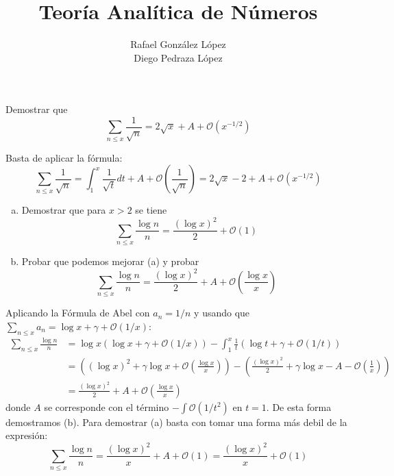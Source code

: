 \documentclass[twoside]{article}
\begin{document}
\title{Teoría Analítica de Números}
\author{Rafael González López\\Diego Pedraza López}
\maketitle

\begin{ejercicio}{1}
Demostrar que
\[ \sum_{n≤x} \frac{1}{\sqrt{n}} =  2 \sqrt{x} + A + \mathcal{O}(x^{-1/2}) \]
\end{ejercicio}
\begin{solucion}
Basta de aplicar la fórmula:
\[ \sum_{n≤x} \frac{1}{\sqrt{n}} = \int_1^x \frac{1}{\sqrt{t}}dt + A + \mathcal{O}\left(\frac{1}{\sqrt{n}}\right) = 2 \sqrt{x}-2+A + \mathcal{O}(x^{-1/2}) \]
\end{solucion}

\newpage

\begin{ejercicio}{2}\mbox{}
\begin{enumerate}[(a)]
	\item Demostrar que para $x > 2$ se tiene
	\[ \sum_{n≤x} \frac{\log n}{n} = \frac{(\log x)^2}{2} + \mathcal{O}(1) \]
	\item Probar que podemos mejorar (a) y probar
	\[ \sum_{n≤x} \frac{\log n}{n} = \frac{(\log x)^2}{2} + A + \mathcal{O}\left(\frac{\log x}{x}\right) \]
\end{enumerate}
\end{ejercicio}
\begin{solucion}
Aplicando la Fórmula de Abel con $a_n=1/n$ y usando que $\sum_{n≤x} a_n = \log x + γ + \mathcal{O}(1/x)$:
\begin{align*}
	\sum_{n≤x} \frac{\log n}{n} & = \log x (\log x + γ + \mathcal{O}(1/x)) - \int_1^x \frac{1}{t}(\log t + γ + \mathcal{O}(1/t))\\
	& = \left((\log x)^2 + γ\log x + \mathcal{O}\left(\frac{\log x}{x}\right)\right) - \left(\frac{(\log x)^2}{2} + γ\log x - A - \mathcal{O}\left(\frac{1}{x}\right)\right)\\
	& = \frac{(\log x)^2}{2} + A + \mathcal{O}\left(\frac{\log x}{x}\right)
\end{align*}
donde $A$ se corresponde con el término $-\int \mathcal{O}(1/t^2)$ en $t=1$. De esta forma demostramos (b). Para demostrar (a) basta con tomar una forma más debil de la expresión:
\[ \sum_{n≤x} \frac{\log n}{n} = \frac{(\log x)^2}{x} + A + \mathcal{O}(1) = \frac{(\log x)^2}{x} + \mathcal{O}(1) \]
\end{solucion}
\end{document}
